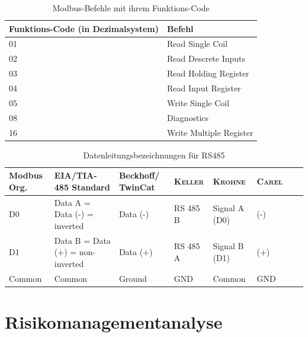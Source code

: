 \begin{table}[htb]
\centering
\caption{Modbus-Befehle mit ihrem Funktions-Code }
\begin{tabular}{ll}
\hline 
\textbf{Funktions-Code (in Dezimalsystem)} & \textbf{Befehl} \\ 
\hline 
\hline
01 & Read Single Coil \\ 
\hline 
02 & Read Descrete Inputs \\ 
\hline 
03 & Read Holding Register \\ 
\hline 
04 & Read Input Register \\ 
\hline 
05 & Write Single Coil \\ 
\hline 
08 & Diagnostics \\ 
\hline 
16 & Write Multiple Register \\ 
\hline 
\hline 
\end{tabular} 
\label{tab:modbus_befehle}
\end{table}

\begin{table}[htb]
\centering
\caption{Datenleitungsbezeichnungen für RS485 }
\begin{tabular}{p{3cm}p{3cm}llllll}
\hline 
\rule[-1ex]{0pt}{2.5ex} \textbf{Modbus Org.} & \textbf{EIA/TIA-485 Standard} & \textbf{Beckhoff/ TwinCat} & \textbf{\textsc{Keller}} & \textbf{\textsc{Krohne}} & \textbf{\textsc{Carel}} \\ 
\hline 
\hline 
\rule[-1ex]{0pt}{2.5ex} D0 & Data A = Data (-) = inverted & Data (-) & RS 485 B & Signal A (D0) & (-) \\ 
\hline 
\rule[-1ex]{0pt}{2.5ex} D1 & Data B = Data (+) = non-inverted & Data (+) & RS 485 A & Signal B (D1) & (+) \\ 
\hline 
\rule[-1ex]{0pt}{2.5ex} Common & Common & Ground & GND & Common & GND \\ 
\hline 
\hline 
\end{tabular} 
\end{table}



\chapter{Risikomanagementanalyse}



